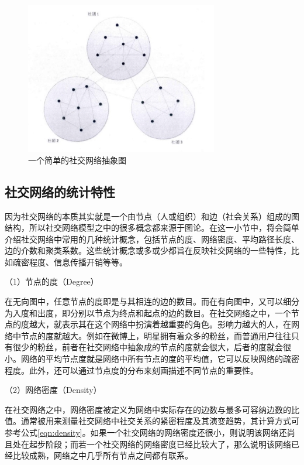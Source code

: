 \begin{figure}
  \centering
  \includegraphics[width=0.75\textwidth]{figures/fig2-1}
  \caption{一个简单的社交网络抽象图}\label{fig:fig2-1}
\end{figure}

\subsection{社交网络的统计特性}
因为社交网络的本质其实就是一个由节点（人或组织）和边（社会关系）组成的图结构，所以社交网络模型之中的很多概念都来源于图论。在这一小节中，将会简单介绍社交网络中常用的几种统计概念，包括节点的度、网络密度、平均路径长度、边的介数和聚类系数。这些统计概念或多或少都旨在反映社交网络的一些特性，比如疏密程度、信息传播开销等等。

（1）节点的度（Degree）

在无向图中，任意节点的度即是与其相连的边的数目。而在有向图中，又可以细分为入度和出度，即分别以节点为终点和起点的边的数目。在社交网络之中，一个节点的度越大，就表示其在这个网络中扮演着越重要的角色。影响力越大的人，在网络中节点的度就越大。例如在微博上，明星拥有着众多的粉丝，而普通用户往往只有很少的粉丝，前者在社交网络中抽象成的节点的度就会很大，后者的度就会很小。网络的平均节点度就是网络中所有节点的度的平均值，它可以反映网络的疏密程度。此外，还可以通过节点度的分布来刻画描述不同节点的重要性。

（2）网络密度（Density）

在社交网络之中，网络密度被定义为网络中实际存在的边数与最多可容纳边数的比值。通常被用来测量社交网络中社交关系的紧密程度及其演变趋势，其计算方式可参考公式\ref{eqn:density}。如果一个社交网络的网络密度还很小，则说明该网络还尚且处在起步阶段；而若一个社交网络的网络密度已经比较大了，那么说明该网络已经比较成熟，网络之中几乎所有节点之间都有联系。

